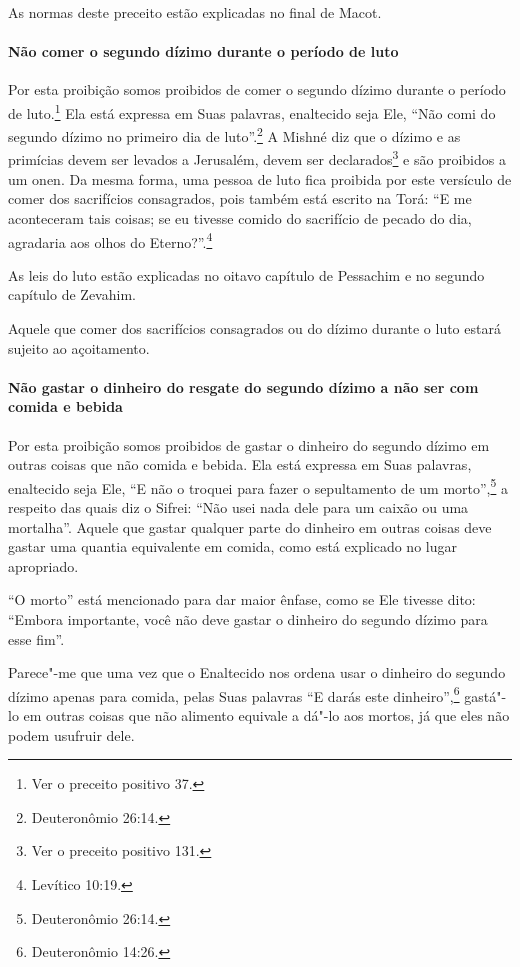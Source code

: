 \begin{multicols}{2}
As normas deste preceito estão explicadas no final de Macot\starr.

\paragraph{Não comer o segundo dízimo durante o período de luto}

Por esta proibição somos proibidos de comer o segundo dízimo durante o
período de luto.\footnote{Ver o preceito positivo 37.} Ela está expressa em Suas
palavras, enaltecido seja Ele, ``Não comi do segundo dízimo no primeiro
dia de luto''.\footnote{Deuteronômio 26:14.} A Mishné diz que o dízimo e as
primícias devem ser levados a Jerusalém, devem ser
declarados\footnote{Ver o preceito positivo 131.} e são proibidos a um onen\starr. Da mesma forma, uma pessoa de luto fica
proibida por este versículo de comer dos sacrifícios consagrados, pois
também está escrito na Torá\starr: ``E me aconteceram tais coisas; se eu
tivesse comido do sacrifício de pecado do dia, agradaria aos olhos do
Eterno?''.\footnote{Levítico 10:19.}

As leis do luto estão explicadas no oitavo capítulo de Pessachim\starr{} e no
segundo capítulo de Zevahim\starr.

Aquele que comer dos sacrifícios consagrados ou do dízimo durante o
luto estará sujeito ao açoitamento.

\paragraph{Não gastar o dinheiro do resgate do segundo dízimo a não ser com
comida e bebida}

Por esta proibição somos proibidos de gastar o dinheiro do segundo
dízimo em outras coisas que não comida e bebida. Ela está expressa em
Suas palavras, enaltecido seja Ele, ``E não o troquei para fazer o
sepultamento de um morto'',\footnote{Deuteronômio 26:14.} a respeito das quais
diz o Sifrei\starr: ``Não usei nada dele para um caixão ou uma mortalha''.
Aquele que gastar qualquer parte do dinheiro em outras coisas deve
gastar uma quantia equivalente em comida, como está explicado no lugar
apropriado.

``O morto'' está mencionado para dar maior ênfase, como se Ele tivesse
dito: ``Embora importante, você não deve gastar o dinheiro do segundo
dízimo para esse fim''.

Parece"-me que uma vez que o Enaltecido nos ordena usar o dinheiro do
segundo dízimo apenas para comida, pelas Suas palavras ``E darás este
dinheiro'',\footnote{Deuteronômio 14:26.} gastá"-lo em outras coisas que não
alimento equivale a dá"-lo aos mortos, já que eles não podem usufruir
dele.


\end{multicols}
